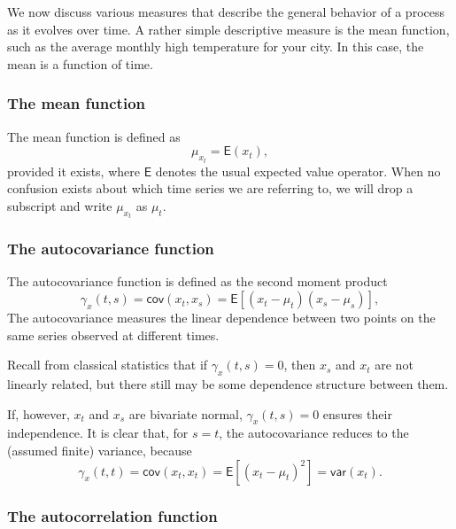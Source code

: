 \documentclass[
paper=128mm:96mm, %
fontsize=9.5pt, %
pagesize, %
parskip=half-, %
]{scrartcl} %
\theoremstyle{mythmstyle} %
\begin{document}
We now discuss various measures that describe the general behavior of a process as it evolves over time. A rather simple descriptive measure is the mean function, such as the average monthly high temperature for your city. In this case, the mean is a function of time.

\subsubsection{The mean function}

The mean function is defined as
\begin{equation}
\label{eq:mean_fct_def}
\mu_{x_t}=\mathsf{E}\left(x_t\right),
\end{equation}
%
provided it exists, where $\mathsf{E}$ denotes the usual expected value operator. When no confusion exists about which time series we are referring to, we will drop a subscript and write $\mu_{x_t}$ as $\mu_t$.
\clearpage

\subsubsection{The autocovariance function}
The autocovariance function is defined as the second moment product
\begin{equation}
\label{eq:acov_def}
\gamma_{x}\left(t,s\right)=\mathsf{cov}\left(x_t,x_s\right)=\mathsf{E}\left[\left(x_t-\mu_t\right)\left(x_s-\mu_s\right)\right],
\end{equation}
%
The autocovariance measures the linear dependence between two points on the same series observed at different times. 

Recall from classical statistics that if $\gamma_{x}\left(t,s\right)=0$, then $x_s$ and $x_t$ are not linearly related, but there still may be some dependence structure between them. 

If, however, $x_t$ and $x_s$ are bivariate normal, $\gamma_{x}\left(t,s\right)=0$ ensures their independence. It is clear that, for $s = t$, the autocovariance reduces to the (assumed finite) variance, because
\begin{equation}
\label{eq:acov_0_def}
\gamma_{x}\left(t,t\right)=\mathsf{cov}\left(x_t,x_t\right)=\mathsf{E}\left[\left(x_t-\mu_t\right)^2\right]=\mathsf{var}(x_t).
\end{equation}
%
\clearpage

\subsubsection{The autocorrelation function}
\end{document}
